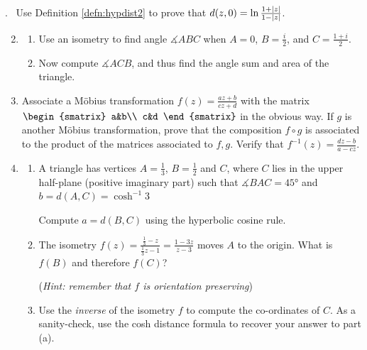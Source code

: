 \goodbreak



\begin{exercises}
	\hangindent{}. \ Use Definition \ref{defn:hypdist2} to prove that $d(z,0)=\ln\frac{1+\left| z\right|}{1-\left| z\right|}$.\vspace{-5pt}
	\begin{enumerate}\setcounter{enumi}{1}
	  \item\begin{enumerate}
	    \item Use an isometry to find angle $\measuredangle ABC$ when $A=0$, $B=\frac i2$, and $C=\frac{1+i}2$.
	    \item Now compute $\measuredangle ACB$, and thus find the angle sum and area of the triangle.
	  \end{enumerate} 
	
	  \item Associate a Möbius transformation $f(z)=\frac{az+b}{cz+d}$ with the matrix
	  $\begin{smatrix}
	  	a&b\\
	  	c&d
	  \end{smatrix}$
	  in the obvious way. If $g$ is another Möbius transformation, prove that the composition $f\circ g$ is associated to the product of the matrices associated to $f,g$. Verify\footnotemark{} that $f^{-1}(z)=\frac{dz-b}{a-cz}$.
	  
	  \item\begin{enumerate}
	    \item A triangle has vertices $A=\frac 13$, $B=\frac 12$ and $C$, where $C$ lies in the upper half-plane (positive imaginary part) such that $\measuredangle{BAC}=\ang{45}$ and $b=d(A,C)=\cosh^{-1}3$\par
	    Compute $a=d(B,C)$ using the hyperbolic cosine rule.
	    
	    \item The isometry $f(z)=\frac{\frac 13-z}{\frac 13z-1}=\frac{1-3z}{z-3}$ moves $A$ to the origin. What is $f(B)$ and therefore $f(C)$?\par
	   	(\emph{Hint: remember that $f$ is orientation preserving})
	    
	    \item Use the \emph{inverse} of the isometry $f$ to compute the co-ordinates of $C$. As a sanity-check, use the cosh distance formula to recover your answer to part (a).    
	  \end{enumerate}
	  

\end{enumerate}
\end{exercises}
